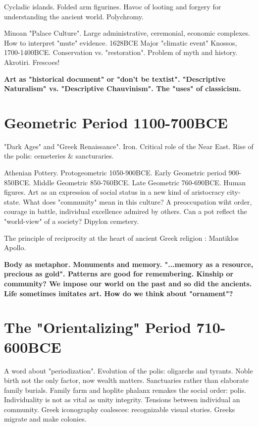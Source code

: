 \documentclass[10pt]{armath}
\begin{document}
\begin{multicols}{2}
  Cycladic islands. Folded arm figurines. Havoc of looting and forgery for
  understanding the ancient world. Polychromy.

  Minoan "Palace Culture". Large administrative, ceremonial, economic
  complexes. How to interpret "mute" evidence. 1628BCE Major "climatic event"
  Knossos, 1700-1400BCE. Conservation vs. "restoration". Problem of myth and
  history. Akrotiri. Frescoes!

  \textbf{Art as "historical document" or "don't be textist". "Descriptive
  Naturalism" vs. "Descriptive Chauvinism". The "uses" of classicism.} 

  \section{Geometric Period 1100-700BCE}%
  \label{sec:geometric_period_1100_700bce}
  
  "Dark Ages" and "Greek Renaissance". Iron. Critical role of the Near East.
  Rise of the polis: cemeteries \& sancturaries.

  Athenian Pottery. Protogeometric 1050-900BCE. Early Geometric period
  900-850BCE. Middle Geometric 850-760BCE. Late Geometric 760-690BCE. Human
  figures. Art as an expression of social status in a new kind of aristocracy
  city-state. What does "community" mean in this culture? A preoccupation wiht
  order, courage in battle, individual excellence admired by others. Can a pot
  reflect the "world-view" of a society? Dipylon cemetery.

  The principle of reciprocity at the heart of ancient Greek religion :
  Mantiklos Apollo.

  \textbf{Body as metaphor. Monuments and memory. "...memory as a resource,
  precious as gold". Patterns are good for remembering. Kinship or community?
We impose our world on the past and so did the ancients. Life sometimes
imitates art. How do we think about "ornament"?} 

\section{The "Orientalizing" Period 710-600BCE}%
\label{sec:the_orientalizing_period_710_600bce}

A word about "periodization". Evolution of the polis: oligarchs and tyrants.
Noble birth not the only factor, now wealth matters. Sanctuaries rather than
elaborate family burials. Family farm and hoplite phalanx remakes the social
order: polis. Individuality is not as vital as unity integrity. Tensions
between individual an community. Greek iconography coalesces: recognizable
visual stories. Greeks migrate and make colonies.


\end{multicols}
\end{document}
